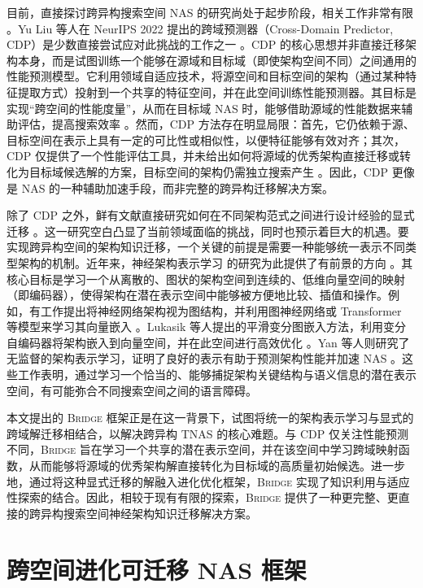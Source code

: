 \documentclass[../main.tex]{subfiles}
\begin{document}
目前，直接探讨跨异构搜索空间 NAS 的研究尚处于起步阶段，相关工作非常有限 。Yu Liu 等人在 NeurIPS 2022 提出的跨域预测器（Cross-Domain Predictor, CDP）是少数直接尝试应对此挑战的工作之一 。CDP 的核心思想并非直接迁移架构本身，而是试图训练一个能够在源域和目标域（即使架构空间不同）之间通用的性能预测模型。它利用领域自适应技术，将源空间和目标空间的架构（通过某种特征提取方式）投射到一个共享的特征空间，并在此空间训练性能预测器。其目标是实现“跨空间的性能度量”，从而在目标域 NAS 时，能够借助源域的性能数据来辅助评估，提高搜索效率 。然而，CDP 方法存在明显局限：首先，它仍依赖于源、目标空间在表示上具有一定的可比性或相似性，以便特征能够有效对齐；其次，CDP 仅提供了一个性能评估工具，并未给出如何将源域的优秀架构直接迁移或转化为目标域候选解的方案，目标空间的架构仍需独立搜索产生 。因此，CDP 更像是 NAS 的一种辅助加速手段，而非完整的跨异构迁移解决方案。

除了 CDP 之外，鲜有文献直接研究如何在不同架构范式之间进行设计经验的显式迁移 。这一研究空白凸显了当前领域面临的挑战，同时也预示着巨大的机遇。要实现跨异构空间的架构知识迁移，一个关键的前提是需要一种能够统一表示不同类型架构的机制。近年来，神经架构表示学习 的研究为此提供了有前景的方向 。其核心目标是学习一个从离散的、图状的架构空间到连续的、低维向量空间的映射（即编码器），使得架构在潜在表示空间中能够被方便地比较、插值和操作。例如，有工作提出将神经网络架构视为图结构，并利用图神经网络或 Transformer 等模型来学习其向量嵌入 。Lukasik 等人提出的平滑变分图嵌入方法，利用变分自编码器将架构嵌入到向量空间，并在此空间进行高效优化 。Yan 等人则研究了无监督的架构表示学习，证明了良好的表示有助于预测架构性能并加速 NAS 。这些工作表明，通过学习一个恰当的、能够捕捉架构关键结构与语义信息的潜在表示空间，有可能弥合不同搜索空间之间的语言障碍。

本文提出的 \textsc{Bridge} 框架正是在这一背景下，试图将统一的架构表示学习与显式的跨域解迁移相结合，以解决跨异构 TNAS 的核心难题。与 CDP 仅关注性能预测不同，\textsc{Bridge} 旨在学习一个共享的潜在表示空间，并在该空间中学习跨域映射函数，从而能够将源域的优秀架构解直接转化为目标域的高质量初始候选。进一步地，通过将这种显式迁移的解融入进化优化框架，\textsc{Bridge} 实现了知识利用与适应性探索的结合。因此，相较于现有有限的探索，\textsc{Bridge} 提供了一种更完整、更直接的跨异构搜索空间神经架构知识迁移解决方案。

\section[\hspace{-2pt}跨空间进化可迁移 NAS 框架]{\heiti{}\hspace{-8pt}跨空间进化可迁移 NAS 框架}
\end{document}
